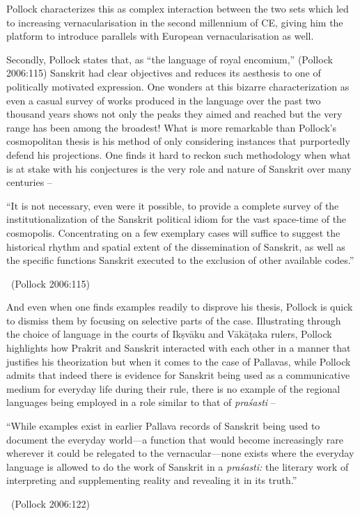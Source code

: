 Pollock characterizes this as complex interaction between the two sets which led to increasing vernacularisation in the second millennium of CE, giving him the platform to introduce parallels with European vernacularisation as well.

Secondly, Pollock states that, as “the language of royal encomium,” (Pollock 2006:115) Sanskrit had clear objectives and reduces its aesthesis to one of politically motivated expression. One wonders at this bizarre characterization as even a casual survey of works produced in the language over the past two thousand years shows not only the peaks they aimed and reached but the very range has been among the broadest! What is more remarkable than Pollock’s cosmopolitan thesis is his method of only considering instances that purportedly defend his projections. One finds it hard to reckon such methodology when what is at stake with his conjectures is the very role and nature of Sanskrit over many centuries –

\begin{myquote}
“It is not necessary, even were it possible, to provide a complete survey of the institutionalization of the Sanskrit political idiom for the vast space-time of the cosmopolis. Concentrating on a few exemplary cases will suffice to suggest the historical rhythm and spatial extent of the dissemination of Sanskrit, as well as the specific functions Sanskrit executed to the exclusion of other available codes.” 

~\hfill (Pollock 2006:115)
\end{myquote}

And even when one finds examples readily to disprove his thesis, Pollock is quick to dismiss them by focusing on selective parts of the case. Illustrating through the choice of language in the courts of Ikṣvāku and Vākāṭaka rulers, Pollock highlights how Prakrit and Sanskrit interacted with each other in a manner that justifies his theorization but when it comes to the case of Pallavas, while Pollock admits that indeed there is evidence for Sanskrit being used as a communicative medium for everyday life during their rule, there is no example of the regional languages being employed in a role similar to that of \textit{praśasti} –

\begin{myquote}
“While examples exist in earlier Pallava records of Sanskrit being used to document the everyday world—a function that would become increasingly rare wherever it could be relegated to the vernacular—none exists where the everyday language is allowed to do the work of Sanskrit in a \textit{praśasti:} the literary work of interpreting and supplementing reality and revealing it in its truth.” 

~\hfill (Pollock 2006:122)
\end{myquote}

